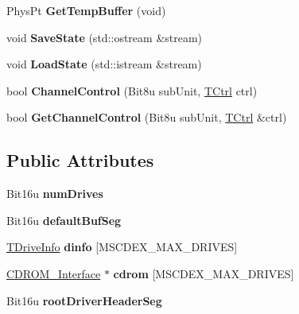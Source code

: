 \begin{DoxyCompactItemize}
\item 
\hypertarget{classCMscdex_af32260380b7e357a0d77baaecbda6aef}{Phys\-Pt {\bfseries Get\-Temp\-Buffer} (void)}\label{classCMscdex_af32260380b7e357a0d77baaecbda6aef}

\item 
\hypertarget{classCMscdex_a9267374dbbd4c82f082cbfeb07ec7317}{void {\bfseries Save\-State} (std\-::ostream \&stream)}\label{classCMscdex_a9267374dbbd4c82f082cbfeb07ec7317}

\item 
\hypertarget{classCMscdex_a0cf511573055dc6f2f8d9669cca861e6}{void {\bfseries Load\-State} (std\-::istream \&stream)}\label{classCMscdex_a0cf511573055dc6f2f8d9669cca861e6}

\item 
\hypertarget{classCMscdex_a4c8cd11142b468ce00f7dbfe2e96830e}{bool {\bfseries Channel\-Control} (Bit8u sub\-Unit, \hyperlink{structSCtrl}{T\-Ctrl} ctrl)}\label{classCMscdex_a4c8cd11142b468ce00f7dbfe2e96830e}

\item 
\hypertarget{classCMscdex_a6facd9da08f3c1ccfa55094165b5dce1}{bool {\bfseries Get\-Channel\-Control} (Bit8u sub\-Unit, \hyperlink{structSCtrl}{T\-Ctrl} \&ctrl)}\label{classCMscdex_a6facd9da08f3c1ccfa55094165b5dce1}

\end{DoxyCompactItemize}
\subsection*{Public Attributes}
\begin{DoxyCompactItemize}
\item 
\hypertarget{classCMscdex_a5b4d6334bdd6f14e75354d225c865abe}{Bit16u {\bfseries num\-Drives}}\label{classCMscdex_a5b4d6334bdd6f14e75354d225c865abe}

\item 
\hypertarget{classCMscdex_a74017c503ae2c44e5c78bfd3190005f8}{Bit16u {\bfseries default\-Buf\-Seg}}\label{classCMscdex_a74017c503ae2c44e5c78bfd3190005f8}

\item 
\hypertarget{classCMscdex_a1392c8b86d5976dafb60694eef28abfa}{\hyperlink{structCMscdex_1_1SDriveInfo}{T\-Drive\-Info} {\bfseries dinfo} \mbox{[}M\-S\-C\-D\-E\-X\-\_\-\-M\-A\-X\-\_\-\-D\-R\-I\-V\-E\-S\mbox{]}}\label{classCMscdex_a1392c8b86d5976dafb60694eef28abfa}

\item 
\hypertarget{classCMscdex_aaadae67160be26c0a1bf0646a8030803}{\hyperlink{classCDROM__Interface}{C\-D\-R\-O\-M\-\_\-\-Interface} $\ast$ {\bfseries cdrom} \mbox{[}M\-S\-C\-D\-E\-X\-\_\-\-M\-A\-X\-\_\-\-D\-R\-I\-V\-E\-S\mbox{]}}\label{classCMscdex_aaadae67160be26c0a1bf0646a8030803}

\item 
\hypertarget{classCMscdex_a9dcc1cbe3482842e279f49d816fa3aaf}{Bit16u {\bfseries root\-Driver\-Header\-Seg}}\label{classCMscdex_a9dcc1cbe3482842e279f49d816fa3aaf}

\end{DoxyCompactItemize}


